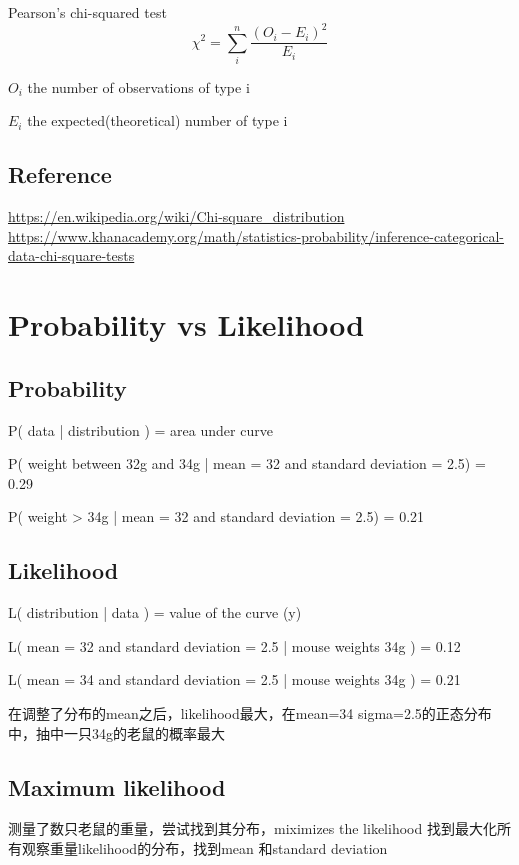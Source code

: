 \documentclass[11pt]{article}
\begin{document}
Pearson's chi-squared test
\begin{equation*}
    \chi^2 = \sum_i^n \frac{(O_i - E_i)^2}{E_i}
\end{equation*}

\begin{list}{-}{}
    \item $O_i$ the number of observations of type i
    \item $E_i$ the expected(theoretical) number of type i
\end{list}

\subsection*{Reference}
\url{https://en.wikipedia.org/wiki/Chi-square_distribution}\\
\indent\url{https://www.khanacademy.org/math/statistics-probability/inference-categorical-data-chi-square-tests}

\section{Probability vs Likelihood}

\subsection{Probability}

P( data | distribution ) = area under curve

P( weight between 32g and 34g | mean = 32 and standard deviation = 2.5) = 0.29

P( weight > 34g | mean = 32 and standard deviation = 2.5) = 0.21

\subsection{Likelihood}

L( distribution | data ) = value of the curve (y)

L( mean = 32 and standard deviation = 2.5 | mouse weights 34g ) = 0.12

L( mean = 34 and standard deviation = 2.5 | mouse weights 34g ) = 0.21

在调整了分布的mean之后，likelihood最大，在mean=34 sigma=2.5的正态分布中，抽中一只34g的老鼠的概率最大

\subsection{Maximum likelihood}

测量了数只老鼠的重量，尝试找到其分布，miximizes the likelihood 找到最大化所有观察重量likelihood的分布，找到mean 和standard deviation
\end{document}
